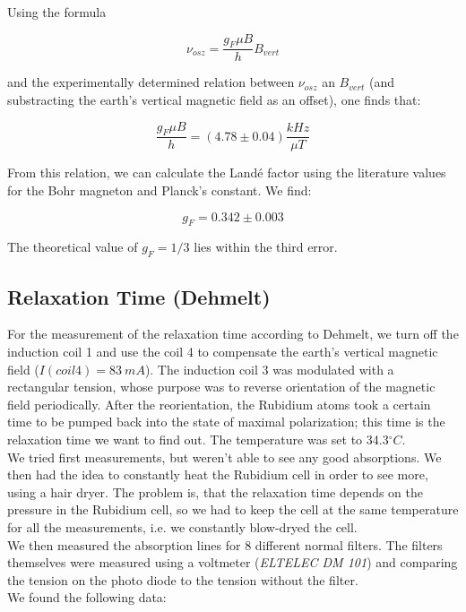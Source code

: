 Using the formula 

$$ \nu_{osz} = \frac{g_F\mu B}{h}B_{vert} $$

and the experimentally determined relation between $\nu_{osz}$ an $B_{vert}$ (and substracting the earth's  vertical magnetic field as an offset), one finds that:

$$\frac{g_F\mu B}{h} = (4.78\pm0.04)\frac{kHz}{\mu T}$$

From this relation, we can calculate the Landé factor using the literature values for the Bohr magneton and Planck's constant. We find:

$$g_F = 0.342 \pm 0.003$$

The theoretical value of $g_F = 1/3$ lies within the third error.



\subsection{Relaxation Time (Dehmelt)}

For the measurement of the relaxation time according to Dehmelt, we turn off the induction coil 1 and use the coil 4 to compensate the earth's vertical magnetic field ($I(coil4) = 83\ mA$). The induction coil 3 was modulated with a rectangular tension, whose purpose was to reverse orientation of the magnetic field periodically. After the reorientation, the Rubidium atoms took a certain time to be pumped back into the state of maximal polarization; this time is the relaxation time we want to find out. The temperature was set to 34.3$^\circ C$.\\

We tried first measurements, but weren't able to see any good absorptions. We then had the idea to constantly heat the Rubidium cell in order to see more, using a hair dryer. The problem is, that the relaxation time depends on the pressure in the Rubidium cell, so we had to keep the cell at the same temperature for all the measurements, i.e. we constantly blow-dryed the cell.\\

We then measured the absorption lines for 8 different normal filters. The filters themselves were measured using a voltmeter (\emph{ELTELEC DM 101}) and comparing the tension on the photo diode to the tension without the filter.\\

We found the following data:


